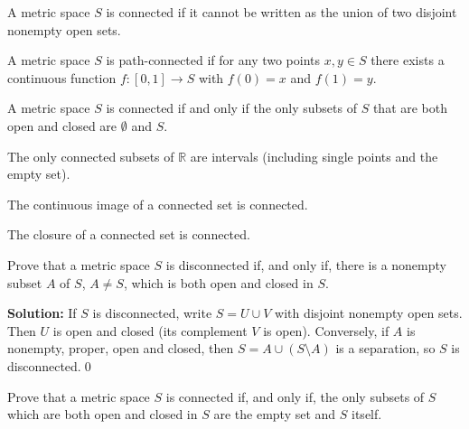 \begin{definition}
A metric space $S$ is connected if it cannot be written as the union of two disjoint nonempty open sets.
\end{definition}

\begin{definition}
A metric space $S$ is path-connected if for any two points $x,y \in S$ there exists a continuous function $f: [0,1] \to S$ with $f(0) = x$ and $f(1) = y$.
\end{definition}

\begin{theorem}
A metric space $S$ is connected if and only if the only subsets of $S$ that are both open and closed are $\emptyset$ and $S$.
\end{theorem}

\begin{theorem}
The only connected subsets of $\mathbb{R}$ are intervals (including single points and the empty set).
\end{theorem}

\begin{theorem}
The continuous image of a connected set is connected.
\end{theorem}

\begin{theorem}
The closure of a connected set is connected.
\end{theorem}



\begin{problembox}
Prove that a metric space $S$ is disconnected if, and only if, there is a nonempty subset $A$ of $S$, $A \neq S$, which is both open and closed in $S$.
\end{problembox}

\noindent\textbf{Solution:}
If $S$ is disconnected, write $S=U\cup V$ with disjoint nonempty open sets. Then $U$ is open and closed (its complement $V$ is open). Conversely, if $A$ is nonempty, proper, open and closed, then $S=A\cup(S\setminus A)$ is a separation, so $S$ is disconnected.\qed



\begin{problembox}
Prove that a metric space $S$ is connected if, and only if, the only subsets of $S$ which are both open and closed in $S$ are the empty set and $S$ itself.
\end{problembox}

